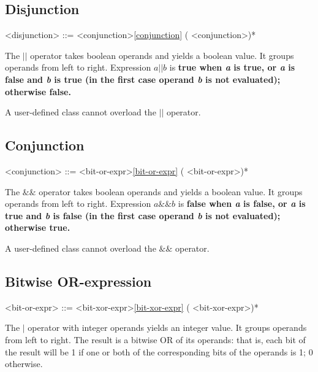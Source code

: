 \documentclass[a4paper,oneside,11pt]{article}
\begin{document}
\subsection{Disjunction}

\begin{grammar}
\label{disjunction}<disjunction> ::= <conjunction>\ref{conjunction} (\lit*{||} <conjunction>)*
\end{grammar}

The $||$ operator takes boolean operands and yields a boolean value. It groups operands from left to right.
Expression $a || b$ is \bf{true} when \emph{a} is \bf{true}, or \emph{a} is \bf{false} and \emph{b} is \bf{true}
(in the first case operand \emph{b} is not evaluated); otherwise \bf{false}.

A user-defined class cannot overload the $||$ operator.

\subsection{Conjunction}

\begin{grammar}
\label{conjunction}<conjunction> ::= <bit-or-expr>\ref{bit-or-expr} (\lit*{\&\&} <bit-or-expr>)*
\end{grammar}

The $\&\&$ operator takes boolean operands and yields a boolean value. It groups operands from left to right.
Expression $a \&\& b$ is \bf{false} when \emph{a} is \bf{false}, or \emph{a} is \bf{true} and \emph{b} is \bf{false}
(in the first case operand \emph{b} is not evaluated); otherwise \bf{true}.

A user-defined class cannot overload the $\&\&$ operator.

\subsection{Bitwise OR-expression}

\begin{grammar}
\label{bit-or-expr}<bit-or-expr> ::= <bit-xor-expr>\ref{bit-xor-expr} (\lit*{|} <bit-xor-expr>)*
\end{grammar}

The $|$ operator with integer operands yields an integer value. It groups operands from left to right.
The result is a bitwise OR of its operands:
that is, each bit of the result will be 1 if one or both of the corresponding bits of the operands is 1; 0 otherwise.
\end{document}
